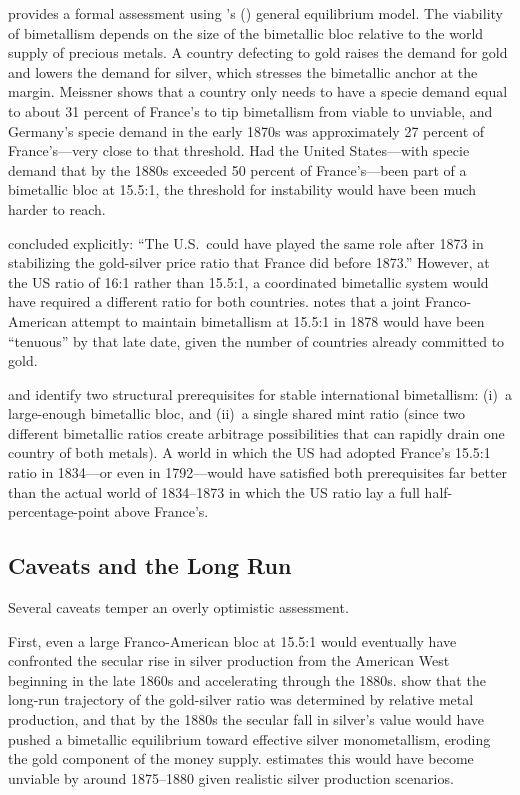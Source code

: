 \documentclass[12pt,letterpaper]{article}
\begin{document}
\citet{meissner2015} provides a formal assessment using \citeauthor{flandreau1996}'s
(\citeyear{flandreau1996}) general equilibrium model.  The viability of bimetallism
depends on the size of the bimetallic bloc relative to the world supply of
precious metals.  A country defecting to gold raises the demand for gold and
lowers the demand for silver, which stresses the bimetallic anchor at the margin.
Meissner shows that a country only needs to have a specie demand equal to about
31 percent of France's to tip bimetallism from viable to unviable, and Germany's
specie demand in the early 1870s was approximately 27 percent of France's---very
close to that threshold.  Had the United States---with specie demand that by the
1880s exceeded 50 percent of France's---been part of a bimetallic bloc at 15.5:1,
the threshold for instability would have been much harder to reach.

\citet{friedman1990jep} concluded explicitly: ``The U.S.\ could have played the same
role after 1873 in stabilizing the gold-silver price ratio that France did before
1873.''  However, at the US ratio of 16:1 rather than 15.5:1, a coordinated bimetallic
system would have required a different ratio for both countries.  \citet{meissner2015}
notes that a joint Franco-American attempt to maintain bimetallism at 15.5:1 in 1878
would have been ``tenuous'' by that late date, given the number of countries already
committed to gold.

\citet{flandreau1996} and \citet{wiegand2022} identify two structural prerequisites
for stable international bimetallism: (i)~a large-enough bimetallic bloc, and
(ii)~a single shared mint ratio (since two different bimetallic ratios create
arbitrage possibilities that can rapidly drain one country of both metals).
A world in which the US had adopted France's 15.5:1 ratio in 1834---or even in
1792---would have satisfied both prerequisites far better than the actual world of
1834--1873 in which the US ratio lay a full half-percentage-point above France's.

\subsection{Caveats and the Long Run}

Several caveats temper an overly optimistic assessment.

First, even a large Franco-American bloc at 15.5:1 would eventually have confronted
the secular rise in silver production from the American West beginning in the late
1860s and accelerating through the 1880s.  \citet{velde_weber2000} show that the
long-run trajectory of the gold-silver ratio was determined by relative metal
production, and that by the 1880s the secular fall in silver's value would have
pushed a bimetallic equilibrium toward effective silver monometallism, eroding the
gold component of the money supply.  \citet{meissner2015} estimates this would
have become unviable by around 1875--1880 given realistic silver production
scenarios.
\end{document}
